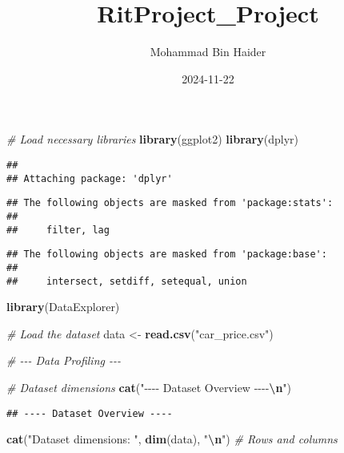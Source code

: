 \documentclass[
]{article}
\title{RitProject\_Project}
\author{Mohammad Bin Haider}
\date{2024-11-22}
\newenvironment{Shaded}{\begin{snugshade}}{\end{snugshade}}
\newcommand{\CommentTok}[1]{\textcolor[rgb]{0.56,0.35,0.01}{\textit{#1}}}
\newcommand{\FunctionTok}[1]{\textcolor[rgb]{0.13,0.29,0.53}{\textbf{#1}}}
\newcommand{\NormalTok}[1]{#1}
\newcommand{\OtherTok}[1]{\textcolor[rgb]{0.56,0.35,0.01}{#1}}
\newcommand{\SpecialCharTok}[1]{\textcolor[rgb]{0.81,0.36,0.00}{\textbf{#1}}}
\newcommand{\StringTok}[1]{\textcolor[rgb]{0.31,0.60,0.02}{#1}}
\begin{document}
\maketitle

\begin{Shaded}
\begin{Highlighting}[]
\CommentTok{\# Load necessary libraries}
\FunctionTok{library}\NormalTok{(ggplot2)}
\FunctionTok{library}\NormalTok{(dplyr)}
\end{Highlighting}
\end{Shaded}

\begin{verbatim}
## 
## Attaching package: 'dplyr'
\end{verbatim}

\begin{verbatim}
## The following objects are masked from 'package:stats':
## 
##     filter, lag
\end{verbatim}

\begin{verbatim}
## The following objects are masked from 'package:base':
## 
##     intersect, setdiff, setequal, union
\end{verbatim}

\begin{Shaded}
\begin{Highlighting}[]
\FunctionTok{library}\NormalTok{(DataExplorer)}

\CommentTok{\# Load the dataset}
\NormalTok{data }\OtherTok{\textless{}{-}} \FunctionTok{read.csv}\NormalTok{(}\StringTok{"car\_price.csv"}\NormalTok{)}

\CommentTok{\# {-}{-}{-} Data Profiling {-}{-}{-}}

\CommentTok{\# Dataset dimensions}
\FunctionTok{cat}\NormalTok{(}\StringTok{"{-}{-}{-}{-} Dataset Overview {-}{-}{-}{-}}\SpecialCharTok{\textbackslash{}n}\StringTok{"}\NormalTok{)}
\end{Highlighting}
\end{Shaded}

\begin{verbatim}
## ---- Dataset Overview ----
\end{verbatim}

\begin{Shaded}
\begin{Highlighting}[]
\FunctionTok{cat}\NormalTok{(}\StringTok{"Dataset dimensions: "}\NormalTok{, }\FunctionTok{dim}\NormalTok{(data), }\StringTok{"}\SpecialCharTok{\textbackslash{}n}\StringTok{"}\NormalTok{)  }\CommentTok{\# Rows and columns}
\end{Highlighting}
\end{Shaded}
\end{document}
